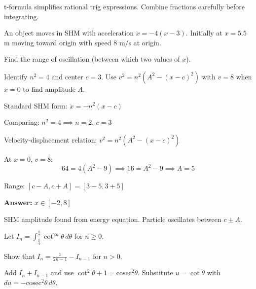 \begin{takeaways}
t-formula simplifies rational trig expressions. Combine fractions carefully before integrating.
\end{takeaways}

\vspace{1cm}

\begin{problem}
An object moves in SHM with acceleration $\ddot{x} = -4(x-3)$. Initially at $x=5.5$ m moving toward origin with speed $8$ m/s at origin.

Find the range of oscillation (between which two values of $x$).
\end{problem}

\begin{hint}
Identify $n^2 = 4$ and center $c = 3$. Use $v^2 = n^2(A^2 - (x-c)^2)$ with $v=8$ when $x=0$ to find amplitude $A$.
\end{hint}

\begin{solution}
Standard SHM form: $\ddot{x} = -n^2(x - c)$

Comparing: $n^2 = 4 \implies n = 2$, $c = 3$

Velocity-displacement relation: $v^2 = n^2(A^2 - (x-c)^2)$

At $x=0$, $v=8$:
\[
64 = 4(A^2 - 9) \implies 16 = A^2 - 9 \implies A = 5
\]

Range: $[c-A, c+A] = [3-5, 3+5]$

\textbf{Answer:} $\boxed{x \in [-2, 8]}$
\end{solution}

\begin{takeaways}
SHM amplitude found from energy equation. Particle oscillates between $c \pm A$.
\end{takeaways}

\vspace{1cm}

\begin{problem}
Let $I_n = \int_{\frac{\pi}{4}}^{\frac{\pi}{2}} \cot^{2n}\theta \, d\theta$ for $n \geq 0$.

Show that $I_n = \frac{1}{2n-1} - I_{n-1}$ for $n > 0$.
\end{problem}

\begin{hint}
Add $I_n + I_{n-1}$ and use $\cot^2\theta + 1 = \text{cosec}^2\theta$. Substitute $u = \cot\theta$ with $du = -\text{cosec}^2\theta \, d\theta$.
\end{hint}

